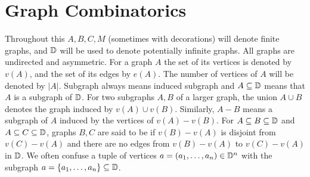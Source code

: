 \section{Graph Combinatorics}
Throughout this \chapa $A, B, C, M$ (sometimes with decorations) will denote finite graphs,
and $\mathbb D$ will be used to denote potentially infinite graphs.
All graphs are undirected and asymmetric.
For a graph $A$ the set of its vertices is denoted by $v(A)$, and the set of its edges by $e(A)$.
The number of vertices of $A$ will be denoted by $|A|$.
Subgraph always means induced subgraph and $A \subseteq \mathbb D$ means that $A$ is a subgraph of $\mathbb D$.
For two subgraphs $A, B$ of a larger graph, the union $A \cup B$ denotes the graph induced by $v(A) \cup v(B)$.
Similarly, $A - B$ means a subgraph of $A$ induced by the vertices of $v(A) - v(B)$.
For $A \subseteq B \subseteq \mathbb D$ and $A \subseteq C \subseteq \mathbb D$,
graphs $B,C$ are said to be  if $v(B) - v(A)$ is disjoint from $v(C) - v(A)$
and there are no edges from $v(B) - v(A)$ to $v(C) - v(A)$ in $\mathbb D$.
We often confuse a tuple of vertices $a = (a_1, \ldots, a_n) \in \mathbb D^n$ with the subgraph $a = \left\{a_1, \ldots, a_n\right\} \subseteq \mathbb D$.


